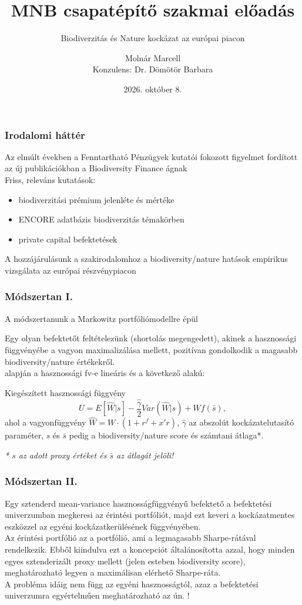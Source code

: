 \documentclass[aspectratio=169,notheorems]{corvinusmetropolis}
\title{MNB csapatépítő szakmai előadás}
\subtitle{Biodiverzitás és Nature kockázat az európai piacon}
\author{Molnár Marcell\\Konzulens: Dr. Dömötör Barbara}
\institute[Corvinus University]
  {
  Pénzügy és számvitel alapszak\\
  Pénzügy specializáció\\
  Email: \putemail\\
  }
\date{2026. október 8.}
\begin{document}
\simpleopen{}

\begin{frame}
  \frametitle{Irodalomi háttér}
  Az elmúlt években a Fenntartható Pénzügyek kutatói fokozott figyelmet fordított az új publikációkban a Biodiversity Finance ágnak\\ 
  Friss, releváns kutatások:
  \begin{itemize}
    \item \alert{biodiverzitási prémium} jelenléte és mértéke \parencite{coqueret_biodiversity_2024, naffa_biodiversity_2024}
    \item \alert{ENCORE adatbázis} biodiverzitás témakörben \parencite{clement_mapping_2025}
    \item \alert{private capital befektetések} \parencite{flammer_biodiversity_2025}\\
  \end{itemize}
  A hozzájárulásunk a szakirodalomhoz a biodiversity/nature hatások empirikus vizsgálata az európai részvénypiacon
\end{frame}

\begin{frame}
  \frametitle{Módszertan I.}
  A módszertanunk a Markowitz portfóliómodellre épül

  Egy olyan befektetőt feltételezünk (shortolás megengedett), akinek a hasznossági függvényébe a vagyon maximalizálása mellett, \alert{pozitívan gondolkodik a magasabb biodiversity/nature értékekről}.\\
  \pause
  \textcite{pedersen_responsible_2021} alapján a \alert{hasznossági fv-e lineáris és a következő alakú}:
  \begin{block}{Kiegészített hasznossági függvény}
  \begin{equation}
    U = E[\widehat{W}|s] - \frac{\hat{\gamma}}{2}Var(\widehat{W}|s) + Wf(\bar{s}),
  \end{equation}
  ahol a vagyonfüggvény $\widehat{W}=W\cdot(1+r^f+x'r)$, $\hat{\gamma}$ az abszolút kockázatelutasító paraméter, $s$ és $\bar{s}$ pedig a biodiversity/nature score és számtani átlaga*.
  \end{block}
  \textit{* $s$ az adott proxy értéket és $\bar{s}$ az átlagát jelöli!}
\end{frame}

\begin{frame}
  \frametitle{Módszertan II.}
  Egy sztenderd mean-variance hasznosságfüggvényű befektető a befektetési univerzumban megkeresi az \alert{érintési portfóliót}, majd ezt keveri a \alert{kockázatmentes eszközzel} az egyéni kockázatkerülésének függvényében.\\
  \pause
  \medskip
  Az érintési portfólió az a portfólió, ami a legmagasabb Sharpe-rátával rendelkezik. Ebből kiindulva \alert{ezt a koncepciót \textcite{pedersen_responsible_2021} általánosította} azzal, hogy \alert{minden egyes sztenderizált proxy mellett} (jelen esteben biodiversity score), \alert{meghatározható legyen a maximálisan elérhető Sharpe-ráta}.\\
  \pause
  \bigskip
  A probléma idáig nem függ az egyéni hasznosságtól, azaz a befektetési univerzumra egyértelműen meghatározható az ún. !
\end{frame}
\end{document}
